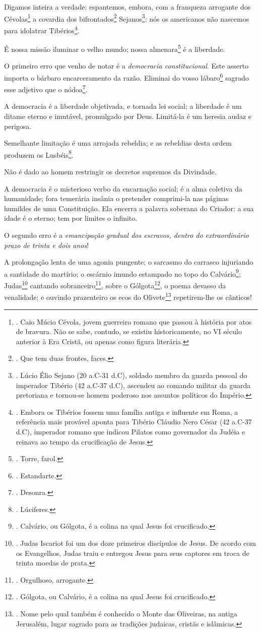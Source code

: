 Digamos inteira a verdade: espantemos, embora, com a franqueza arrogante
dos Cévolas\footnote{. Caio Múcio Cévola, jovem guerreiro romano que
  passou à história por atos de bravura. Não se sabe, contudo, se
  existiu historicamente, no VI século anterior à Era Cristã, ou apenas
  como figura literária.} a covardia dos bifrontados\footnote{. Que tem
  duas frontes, faces.} Sejanos\footnote{. Lúcio Élio Sejano (20 a.C-31
  d.C), soldado membro da guarda pessoal do imperador Tibério (42 a.C-37
  d.C), ascendeu ao comando militar da guarda pretoriana e tornou-se
  homem poderoso nos assuntos políticos do Império.}: nós os americanos
não nascemos para idolatrar Tibérios\footnote{. Embora os Tibérios
  fossem uma família antiga e influente em Roma, a referência mais
  provável aponta para Tibério Cláudio Nero César (42 a.C-37 d.C),
  imperador romano que indicou Pilatos como governador da Judéia e
  reinava ao tempo da crucificação de Jesus.}.

É nossa missão iluminar o velho mundo; nossa almenara\footnote{. Torre,
  farol.} é a liberdade.

O primeiro erro que venho de notar é a \emph{democracia constitucional}.
Este asserto importa o bárbaro encarceramento da razão. Eliminai do
vosso lábaro\footnote{. Estandarte.} sagrado esse adjetivo que o
nódoa\footnote{. Desonra.}.

A democracia é a liberdade objetivada, e tornada lei social; a liberdade
é um ditame eterno e imutável, promulgado por Deus. Limitá-la é um
heresia audaz e perigosa.

Semelhante limitação é uma arrojada rebeldia; e as rebeldias desta ordem
produzem os Lusbéis\footnote{. Lúciferes.}.

Não é dado ao homem restringir os decretos supremos da Divindade.

A democracia é o misterioso verbo da encarnação social; é a alma
coletiva da humanidade; fora temerária insânia o pretender comprimi-la
nas páginas humildes de uma Constituição. Ela encerra a palavra soberana
do Criador: a sua idade é o eterno; tem por limites o infinito.

O segundo erro é a \emph{emancipação gradual dos escravos, dentro do
extraordinário prazo de trinta e dois anos}!

A prolongação lenta de uma agonia pungente; o sarcasmo do carrasco
injuriando a santidade do martírio; o escárnio imundo estampado no topo
do Calvário\footnote{. Calvário, ou Gólgota, é a colina na qual Jesus
  foi crucificado.}; Judas\footnote{. Judas Iscariot foi um dos doze
  primeiros discípulos de Jesus. De acordo com os Evangelhos, Judas
  traiu e entregou Jesus para seus captores em troca de trinta moedas de
  prata.} cantando sobranceiro\footnote{. Orgulhoso, arrogante.}, sobre
o Gólgota\footnote{. Gólgota, ou Calvário, é a colina na qual Jesus foi
  crucificado.}, o poema devasso da venalidade; e ouvindo prazenteiro os
ecos do Olivete\footnote{. Nome pelo qual também é conhecido o Monte das
  Oliveiras, na antiga Jerusalém, lugar sagrado para as tradições
  judaicas, cristãs e islâmicas.} repetirem-lhe os cânticos!

